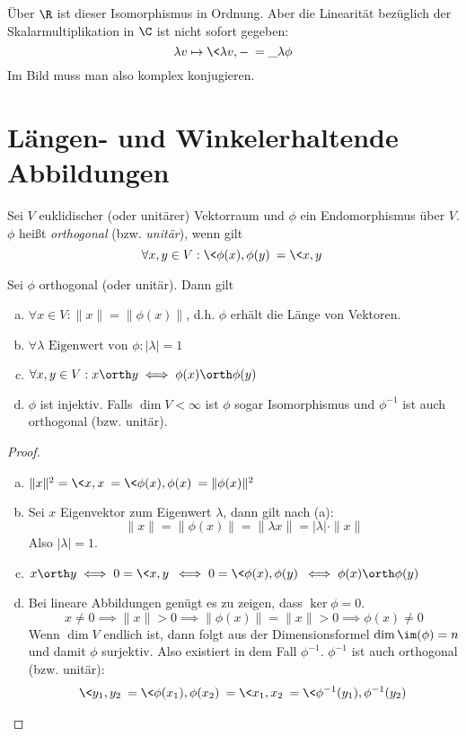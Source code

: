 \documentclass[a4paper, 10pt]{scrbook}
\begin{document}
\begin{note}
	Über $\R$ ist dieser Isomorphismus in Ordnung.
	Aber die Linearität bezüglich der Skalarmultiplikation in $\C$ ist nicht sofort gegeben:
	\[
		\lambda v \mapsto \<\lambda v, -\> = \_{\lambda}\phi
	\]
	Im Bild muss man also komplex konjugieren.
\end{note}


\section{Längen- und Winkelerhaltende Abbildungen}


\begin{df}
	\label{df:13.15}
	Sei $V$ euklidischer (oder unitärer) Vektorraum und $\phi$ ein Endomorphismus über $V$.
	$\phi$ heißt \emph{orthogonal} (bzw. \emph{unitär}), wenn gilt
	\[
		\forall x,y\in V : \<\phi(x), \phi(y)\> = \<x,y\>
	\]
\end{df}

\begin{lem}
	\label{lem:13.16}
	Sei $\phi$ orthogonal (oder unitär).
	Dann gilt
	\begin{enumerate}[(a)]
		\item
			$\forall x\in V: \|x\| = \|\phi(x)\|$, d.h. $\phi$ erhält die Länge von Vektoren.
		\item
			$\forall \lambda \text{ Eigenwert von }\phi : |\lambda| = 1$
		\item
			$\forall x,y\in V:x\orth y \iff \phi(x) \orth \phi(y)$
		\item
			$\phi$ ist injektiv.
			Falls $\dim V<\infty$ ist $\phi$ sogar Isomorphismus und $\phi^{-1}$ ist auch orthogonal (bzw. unitär).
	\end{enumerate}
	\begin{proof}
		\begin{enumerate}[(a)]
			\item
				$\|x\|^2 = \<x,x\> = \<\phi(x),\phi(x)\> = \|\phi(x)\|^2$
			\item
				Sei $x$ Eigenvektor zum Eigenwert $\lambda$, dann gilt nach (a):
				\[
					\|x\| = \|\phi(x)\| = \|\lambda x\| = |\lambda|\cdot \|x\|
				\]
				Also $|\lambda| = 1$.
			\item
				$x\orth y \iff 0=\<x,y\> \iff 0=\<\phi(x),\phi(y)\> \iff \phi(x) \orth \phi(y)$
			\item
				Bei lineare Abbildungen genügt es zu zeigen, dass $\ker\phi = 0$.
				\[
					x\neq 0 \implies \|x\| > 0 \implies \|\phi(x)\| = \|x\| > 0 \implies \phi(x) \neq 0
				\]
				Wenn $\dim V$ endlich ist, dann folgt aus der Dimensionsformel $\dim \im(\phi) = n$ und damit $\phi$ surjektiv.
				Also existiert in dem Fall $\phi^{-1}$.
				$\phi^{-1}$ ist auch orthogonal (bzw. unitär):
				\begin{align*}
					\<y_1,y_2\> = \<\phi(x_1),\phi(x_2)\> = \<x_1,x_2\> = \<\phi^{-1}(y_1),\phi^{-1}(y_2)\>
				\end{align*}
		\end{enumerate}
	\end{proof}
\end{lem}
\end{document}
